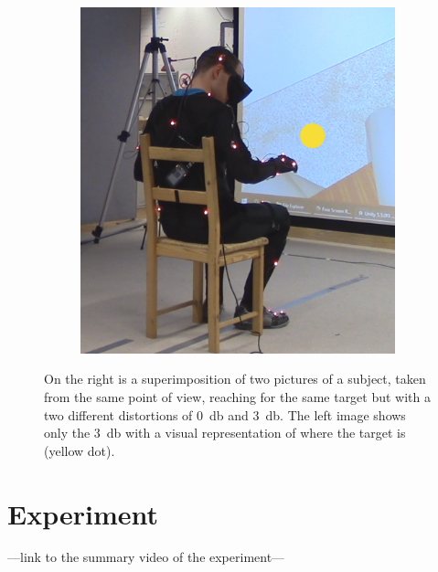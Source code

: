 \begin{figure}[h]
\begin{subfigure}[b]{.3\textwidth}
        \includegraphics[width=\textwidth]{Figures/handPositionTarget.png}
    \end{subfigure}
        
    \caption{On the right is a superimposition of two pictures of a subject, taken from the same point of view, reaching for the same target but with a two different distortions of \SI{0}{\decibel} and \SI{3}{\decibel}. The left image shows only the \SI{3}{\decibel} with a visual representation of where the target is (yellow dot).}
    \label{fig:realMocapDistortion}
\end{figure}

\section{Experiment}

---link to the summary video of the experiment---
